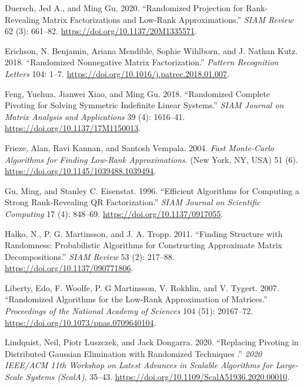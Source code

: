 \documentclass[
  12pt,
]{article}
\newlength{\cslhangindent}
\newenvironment{CSLReferences}[2] %
 {\begin{list}{}{%
  \setlength{\itemindent}{0pt}
  \setlength{\leftmargin}{0pt}
  \setlength{\parsep}{0pt}
  \ifodd #1
   \setlength{\leftmargin}{\cslhangindent}
   \setlength{\itemindent}{-1\cslhangindent}
  \fi
  \setlength{\itemsep}{#2\baselineskip}}}
 {\end{list}}
\begin{document}
\begin{CSLReferences}{1}{1}
Duersch, Jed A., and Ming Gu. 2020. {``Randomized Projection for
Rank-Revealing Matrix Factorizations and Low-Rank Approximations.''}
\emph{SIAM Review} 62 (3): 661--82.
\url{https://doi.org/10.1137/20M1335571}.

Erichson, N. Benjamin, Ariana Mendible, Sophie Wihlborn, and J. Nathan
Kutz. 2018. {``Randomized Nonnegative Matrix Factorization.''}
\emph{Pattern Recognition Letters} 104: 1--7.
\url{https://doi.org/10.1016/j.patrec.2018.01.007}.

Feng, Yuehua, Jianwei Xiao, and Ming Gu. 2018. {``Randomized Complete
Pivoting for Solving Symmetric Indefinite Linear Systems.''} \emph{SIAM
Journal on Matrix Analysis and Applications} 39 (4): 1616--41.
\url{https://doi.org/10.1137/17M1150013}.

Frieze, Alan, Ravi Kannan, and Santosh Vempala. 2004. \emph{Fast
Monte-Carlo Algorithms for Finding Low-Rank Approximations}. (New York,
NY, USA) 51 (6). \url{https://doi.org/10.1145/1039488.1039494}.

Gu, Ming, and Stanley C. Eisenstat. 1996. {``Efficient Algorithms for
Computing a Strong Rank-Revealing QR Factorization.''} \emph{SIAM
Journal on Scientific Computing} 17 (4): 848--69.
\url{https://doi.org/10.1137/0917055}.

Halko, N., P. G. Martinsson, and J. A. Tropp. 2011. {``Finding Structure
with Randomness: Probabilistic Algorithms for Constructing Approximate
Matrix Decompositions.''} \emph{SIAM Review} 53 (2): 217--88.
\url{https://doi.org/10.1137/090771806}.

Liberty, Edo, F. Woolfe, P. G Martinsson, V. Rokhlin, and V. Tygert.
2007. {``Randomized Algorithms for the Low-Rank Approximation of
Matrices.''} \emph{Proceedings of the National Academy of Sciences} 104
(51): 20167--72. \url{https://doi.org/10.1073/pnas.0709640104}.

Lindquist, Neil, Piotr Luszczek, and Jack Dongarra. 2020. {``{Replacing
Pivoting in Distributed Gaussian Elimination with Randomized Techniques
}.''} \emph{2020 IEEE/ACM 11th Workshop on Latest Advances in Scalable
Algorithms for Large-Scale Systems (ScalA)}, 35--43.
\url{https://doi.org/10.1109/ScalA51936.2020.00010}.


\end{CSLReferences}
\end{document}
